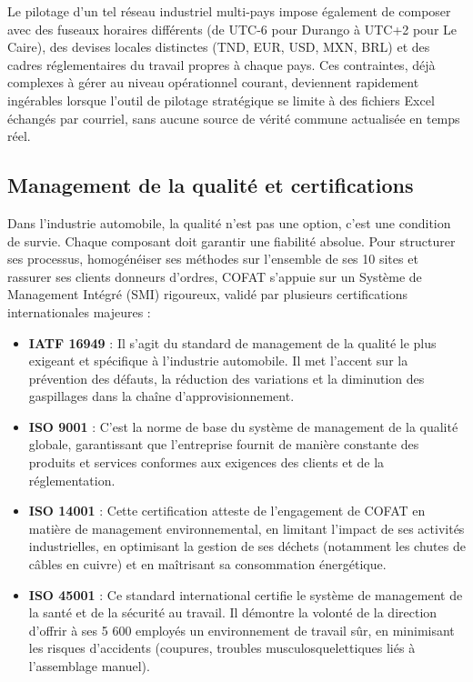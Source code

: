 Le pilotage d'un tel réseau industriel multi-pays impose également de composer avec des fuseaux horaires différents (de UTC-6 pour Durango à UTC+2 pour Le Caire), des devises locales distinctes (TND, EUR, USD, MXN, BRL) et des cadres réglementaires du travail propres à chaque pays. Ces contraintes, déjà complexes à gérer au niveau opérationnel courant, deviennent rapidement ingérables lorsque l'outil de pilotage stratégique se limite à des fichiers Excel échangés par courriel, sans aucune source de vérité commune actualisée en temps réel.

\subsection{Management de la qualité et certifications}


Dans l'industrie automobile, la qualité n'est pas une option, c'est une condition de survie. Chaque composant doit garantir une fiabilité absolue. Pour structurer ses processus, homogénéiser ses méthodes sur l'ensemble de ses 10 sites et rassurer ses clients donneurs d'ordres, COFAT s'appuie sur un Système de Management Intégré (SMI) rigoureux, validé par plusieurs certifications internationales majeures :

\begin{itemize}
    \item \textbf{IATF 16949} : Il s'agit du standard de management de la qualité le plus exigeant et spécifique à l'industrie automobile. Il met l'accent sur la prévention des défauts, la réduction des variations et la diminution des gaspillages dans la chaîne d'approvisionnement.
    \item \textbf{ISO 9001} : C'est la norme de base du système de management de la qualité globale, garantissant que l'entreprise fournit de manière constante des produits et services conformes aux exigences des clients et de la réglementation.
    \item \textbf{ISO 14001} : Cette certification atteste de l'engagement de COFAT en matière de management environnemental, en limitant l'impact de ses activités industrielles, en optimisant la gestion de ses déchets (notamment les chutes de câbles en cuivre) et en maîtrisant sa consommation énergétique.
    \item \textbf{ISO 45001} : Ce standard international certifie le système de management de la santé et de la sécurité au travail. Il démontre la volonté de la direction d'offrir à ses 5 600 employés un environnement de travail sûr, en minimisant les risques d'accidents (coupures, troubles musculosquelettiques liés à l'assemblage manuel).
\end{itemize}

